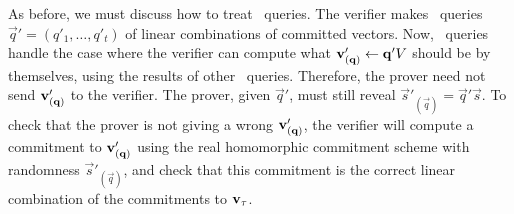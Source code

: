 As before, we must discuss how to treat \ILCcheck\ queries. The verifier makes \ILCcheck\ queries $\vec{q}'=(q'_1,\ldots,q'_t)$ of linear combinations of committed vectors. Now, \ILCcheck\ queries handle the case where the verifier can compute what ${\mathbf{v}}'_{(\mathbf{q})}\gets \mathbf{q}' V$ should be by themselves, using the results of other \ILCopen\ queries. Therefore, the prover need not send ${\mathbf{v}}'_{(\mathbf{q})}$ to the verifier. The prover, given $\vec{q}'$, must still reveal $\vec{s}'_{(\vec{q})}=\vec{q}'\vec{s}$. To check that the prover is not giving a wrong ${\mathbf{v}}'_{(\mathbf{q})}$, the verifier will compute a commitment to ${\mathbf{v}}'_{(\mathbf{q})}$ using the real homomorphic commitment scheme with randomness $\vec{s}'_{(\vec{q})}$, and check that this commitment is the correct linear combination of the commitments to ${\mathbf{v}}_\tau$.
